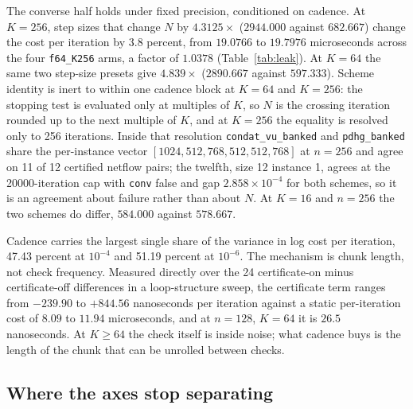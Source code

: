 The converse half holds under fixed precision, conditioned on cadence. At
$K=256$, step sizes that change $N$ by $4.3125\times$ ($2944.000$ against
$682.667$) change the cost per iteration by 3.8 percent, from $19.0766$ to
$19.7976$ microseconds across the four \texttt{f64\_K256} arms, a factor of
$1.0378$ (Table~\ref{tab:leak}). At $K=64$ the same two step-size presets give
$4.839\times$ ($2890.667$ against $597.333$). Scheme identity is inert to within
one cadence block at $K=64$ and $K=256$: the stopping test is evaluated only at
multiples of $K$, so $N$ is the crossing iteration rounded up to the next
multiple of $K$, and at $K=256$ the equality is resolved only to 256 iterations.
Inside that resolution \texttt{condat\_vu\_banked} and \texttt{pdhg\_banked}
share the per-instance vector $[1024, 512, 768, 512, 512, 768]$ at $n{=}256$ and
agree on 11 of 12 certified netflow pairs; the twelfth, size 12 instance 1,
agrees at the 20000-iteration cap with \texttt{conv} false and gap
$2.858 \times 10^{-4}$ for both schemes, so it is an agreement about failure
rather than about $N$. At $K=16$ and $n{=}256$ the two schemes do differ,
$584.000$ against $578.667$.

Cadence carries the largest single share of the variance in log cost per
iteration, 47.43 percent at $10^{-4}$ and 51.19 percent at $10^{-6}$.
The mechanism is chunk length, not check frequency. Measured directly over the
24 certificate-on minus certificate-off differences in a loop-structure sweep,
the certificate term ranges from $-239.90$ to $+844.56$ nanoseconds per
iteration against a static per-iteration cost of $8.09$ to $11.94$ microseconds,
and at $n{=}128$, $K=64$ it is $26.5$ nanoseconds. At $K \geq 64$ the check
itself is inside noise; what cadence buys is the length of the chunk that can be
unrolled between checks.

\subsection{Where the axes stop separating}

